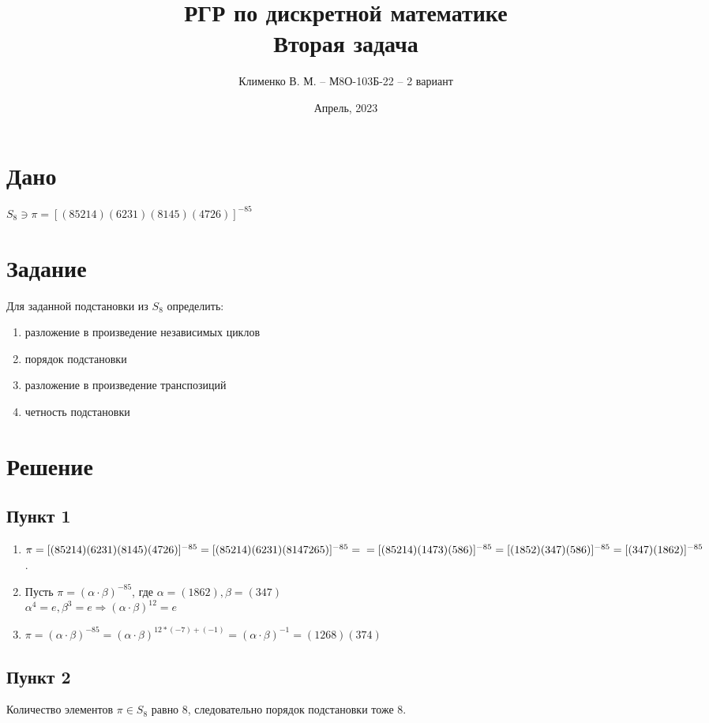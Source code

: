 \documentclass{article}
\title{РГР по дискретной математике\\Вторая задача}
\author{Клименко В. М. -- М8О-103Б-22 -- 2 вариант}
\date{Апрель, 2023}
\begin{document}
\maketitle


\section*{Дано}
$S_8 \ni \pi = [(85214)(6231)(8145)(4726)]^{-85}$ 

\section*{Задание}
Для заданной подстановки из $S_8$ определить:
\begin{enumerate}
    \item разложение в произведение независимых циклов
    \item порядок подстановки
    \item разложение в произведение транспозиций
    \item четность подстановки
\end{enumerate}


\section*{Решение}
\subsection*{Пункт 1}
\begin{enumerate}
\item $\pi = [(85214)(6231)(8145)(4726)]^{-85} = [(85214)(6231)(8147265)]^{-85} = \\
= [(85214)(1473)(586)]^{-85} = [(1852)(347)(586)]^{-85} 
= [(347)(1862)]^{-85} $.

\item Пусть $\pi = (\alpha \cdot \beta)^{-85}$, где $\alpha = (1862), \beta = (347)$ \\
$\alpha^{4} = e, \beta^{3} = e \Rightarrow (\alpha \cdot \beta)^{12} = e$

\item $\pi = (\alpha \cdot \beta)^{-85} = (\alpha \cdot \beta)^{12 * (-7) + (-1)} = (\alpha \cdot \beta)^{-1} = (1268)(374)$

\end{enumerate}

\subsection*{Пункт 2}
Количество элементов $\pi \in S_8$ равно 8, следовательно порядок подстановки тоже $8$.
\end{document}
